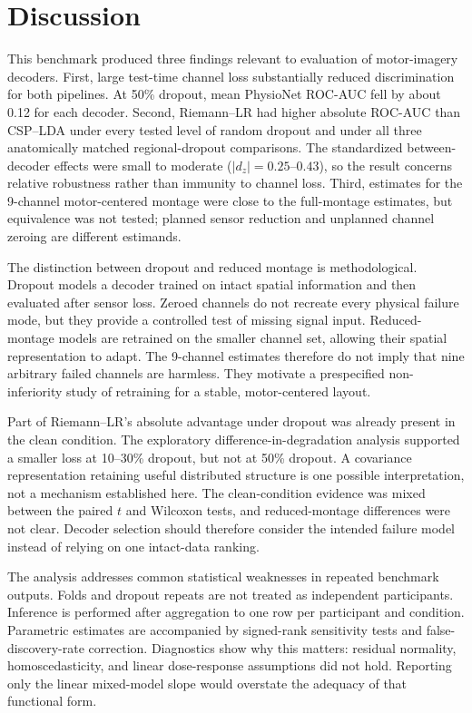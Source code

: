 \documentclass[11pt]{article}
\begin{document}
\section{Discussion}
This benchmark produced three findings relevant to evaluation of motor-imagery decoders. First, large test-time channel loss substantially reduced discrimination for both pipelines. At 50\% dropout, mean PhysioNet ROC-AUC fell by about 0.12 for each decoder. Second, Riemann--LR had higher absolute ROC-AUC than CSP--LDA under every tested level of random dropout and under all three anatomically matched regional-dropout comparisons. The standardized between-decoder effects were small to moderate ($|d_z|=0.25$--$0.43$), so the result concerns relative robustness rather than immunity to channel loss. Third, estimates for the 9-channel motor-centered montage were close to the full-montage estimates, but equivalence was not tested; planned sensor reduction and unplanned channel zeroing are different estimands.

The distinction between dropout and reduced montage is methodological. Dropout models a decoder trained on intact spatial information and then evaluated after sensor loss. Zeroed channels do not recreate every physical failure mode, but they provide a controlled test of missing signal input. Reduced-montage models are retrained on the smaller channel set, allowing their spatial representation to adapt. The 9-channel estimates therefore do not imply that nine arbitrary failed channels are harmless. They motivate a prespecified non-inferiority study of retraining for a stable, motor-centered layout.

Part of Riemann--LR's absolute advantage under dropout was already present in the clean condition. The exploratory difference-in-degradation analysis supported a smaller loss at 10--30\% dropout, but not at 50\% dropout. A covariance representation retaining useful distributed structure is one possible interpretation, not a mechanism established here. The clean-condition evidence was mixed between the paired $t$ and Wilcoxon tests, and reduced-montage differences were not clear. Decoder selection should therefore consider the intended failure model instead of relying on one intact-data ranking.

The analysis addresses common statistical weaknesses in repeated benchmark outputs. Folds and dropout repeats are not treated as independent participants. Inference is performed after aggregation to one row per participant and condition. Parametric estimates are accompanied by signed-rank sensitivity tests and false-discovery-rate correction. Diagnostics show why this matters: residual normality, homoscedasticity, and linear dose-response assumptions did not hold. Reporting only the linear mixed-model slope would overstate the adequacy of that functional form.
\end{document}
